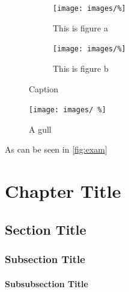 \begin{figure}[H]
\centering
\begin{subfigure}[t]{0.49\textwidth}
\centering
\texttt{[image: images/\%]}
\caption{This is figure a}
\label{fig:figureA}
\end{subfigure}
\begin{subfigure}[t]{0.49\textwidth}
\centering
\texttt{[image: images/\%]}
\caption{This is figure b}
\label{fig:figureB}
\end{subfigure}
\caption{Caption}
\end{figure}

\begin{figure}
\begin{center}
\texttt{[image: images/ \%]}
\end{center}
\caption{A gull}
\end{figure}

As can be seen in \cref{fig:exam}\\
\chapter{Chapter Title}
\label{ch:Chapter Title}

\section{Section Title}
\label{sec:Section Title}

\subsection{Subsection Title}
\label{subsec:Subsection Title}

\subsubsection{Subsubsection Title}
\label{bb:Subsubsection Title}





